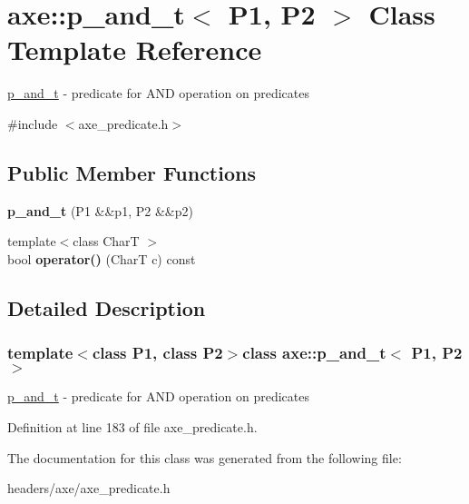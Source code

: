 \hypertarget{classaxe_1_1p__and__t}{\section{axe\+:\+:p\+\_\+and\+\_\+t$<$ P1, P2 $>$ Class Template Reference}
\label{classaxe_1_1p__and__t}
}


\hyperlink{classaxe_1_1p__and__t}{p\+\_\+and\+\_\+t} -\/ predicate for A\+N\+D operation on predicates  




{\ttfamily \#include $<$axe\+\_\+predicate.\+h$>$}

\subsection*{Public Member Functions}
\begin{DoxyCompactItemize}
\item 
\hypertarget{classaxe_1_1p__and__t_aef930c6678840eb11cd27ef819c2bdd5}{{\bfseries p\+\_\+and\+\_\+t} (P1 \&\&p1, P2 \&\&p2)}\label{classaxe_1_1p__and__t_aef930c6678840eb11cd27ef819c2bdd5}

\item 
\hypertarget{classaxe_1_1p__and__t_a4bd10b554dd74853bcb1d20149936985}{{\footnotesize template$<$class Char\+T $>$ }\\bool {\bfseries operator()} (Char\+T c) const }\label{classaxe_1_1p__and__t_a4bd10b554dd74853bcb1d20149936985}

\end{DoxyCompactItemize}


\subsection{Detailed Description}
\subsubsection*{template$<$class P1, class P2$>$class axe\+::p\+\_\+and\+\_\+t$<$ P1, P2 $>$}

\hyperlink{classaxe_1_1p__and__t}{p\+\_\+and\+\_\+t} -\/ predicate for A\+N\+D operation on predicates 

Definition at line 183 of file axe\+\_\+predicate.\+h.



The documentation for this class was generated from the following file\+:\begin{DoxyCompactItemize}
\item 
headers/axe/axe\+\_\+predicate.\+h\end{DoxyCompactItemize}

